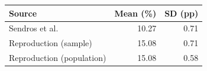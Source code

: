 \begin{tabular}{lrr}
\toprule
Source & Mean (\%) & SD (pp) \\
\midrule
Sendros et al. & 10.27 & 0.71 \\
Reproduction (sample) & 15.08 & 0.71 \\
Reproduction (population) & 15.08 & 0.58 \\
\bottomrule
\end{tabular}
